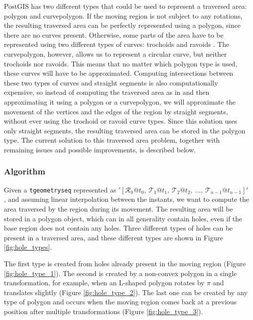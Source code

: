 PostGIS has two different types that could be used to represent a traversed area: polygon and curvepolygon. If the moving region is not subject to any rotations, the resulting traversed area can be perfectly represented using a polygon, since there are no curves present. Otherwise, some parts of the area have to be represented using two different types of curves: trochoids and ravoids \cite{fmregion}. The curvepolygon, however, allows us to represent a circular curve, but neither trochoids nor ravoids. This means that no matter which polygon type is used, these curves will have to be approximated. Computing intersections between these two types of curves and straight segments is also computationally expensive, so instead of computing the traversed area as in \cite{fmregion} and then approximating it using a polygon or a curvepolygon, we will approximate the movement of the vertices and the edges of the region by straight segments, without ever using the trochoid or ravoid curve types. Since this solution uses only straight segments, the resulting traversed area can be stored in the polygon type. The current solution to this traversed area problem, together with remaining issues and possible improvements, is described below.

\subsubsection{Algorithm}

Given a \lstinline+tgeometryseq+ represented as $'[\mathcal{R}_0@t_0,\ \mathcal{T}_1@t_1,\ \mathcal{T}_2@t_2,\ ..., \ \mathcal{T}_{n-1}@t_{n-1}]'$, and assuming linear interpolation between the instants, we want to compute the area traversed by the region during its movement. The resulting area will be stored in a polygon object, which can in all generality contain holes, even if the base region does not contain any holes. Three different types of holes can be present in a traversed area, and these different types are shown in Figure \ref{fig:hole_types}. 

The first type is created from holes already present in the moving region (Figure \ref{fig:hole_type_1}). The second is created by a non-convex polygon in a single transformation, for example, when an L-shaped polygon rotates by $\pi$ and translates slightly (Figure \ref{fig:hole_type_2}). The last one can be created by any type of polygon and occurs when the moving region comes back at a previous position after multiple transformations (Figure \ref{fig:hole_type_3}).

